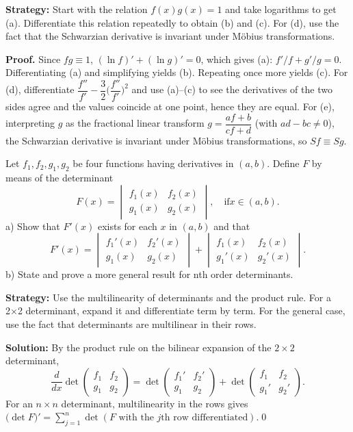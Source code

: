 \noindent\textbf{Strategy:} Start with the relation \( f(x)g(x) = 1 \) and take logarithms to get (a). Differentiate this relation repeatedly to obtain (b) and (c). For (d), use the fact that the Schwarzian derivative is invariant under Möbius transformations.

\noindent\textbf{Proof.}
Since $fg\equiv 1$, $(\ln f)'+(\ln g)'=0$, which gives (a): $f'/f+g'/g=0$. Differentiating (a) and simplifying yields (b). Repeating once more yields (c). For (d), differentiate $\dfrac{f''}{f'}-\dfrac{3}{2}\Big(\dfrac{f''}{f'}\Big)^{\!2}$ and use (a)–(c) to see the derivatives of the two sides agree and the values coincide at one point, hence they are equal. For (e), interpreting $g$ as the fractional linear transform $g=\dfrac{af+b}{cf+d}$ (with $ad-bc\ne 0$), the Schwarzian derivative is invariant under Möbius transformations, so $Sf\equiv Sg$.



\begin{problembox}
Let \( f_1, f_2, g_1, g_2 \) be four functions having derivatives in \( (a, b) \). Define \( F \) by means of the determinant
\[ F(x) = \begin{vmatrix}
f_1(x) & f_2(x) \\
g_1(x) & g_2(x)
\end{vmatrix}, \quad \text{if} x \in (a, b). \]
a) Show that \( F'(x) \) exists for each \( x \) in \( (a, b) \) and that
\[ F'(x) = \begin{vmatrix}
f_1'(x) & f_2'(x) \\
g_1(x) & g_2(x)
\end{vmatrix} + \begin{vmatrix}
f_1(x) & f_2(x) \\
g_1'(x) & g_2'(x)
\end{vmatrix}. \]
b) State and prove a more general result for nth order determinants.
\end{problembox}

\noindent\textbf{Strategy:} Use the multilinearity of determinants and the product rule. For a 2×2 determinant, expand it and differentiate term by term. For the general case, use the fact that determinants are multilinear in their rows.

\bigskip\noindent\textbf{Solution:}
By the product rule on the bilinear expansion of the $2\times2$ determinant,
\[\frac{d}{dx}\det\begin{pmatrix}f_1&f_2\\ g_1&g_2\end{pmatrix}=\det\begin{pmatrix}f_1'&f_2'\\ g_1&g_2\end{pmatrix}+\det\begin{pmatrix}f_1&f_2\\ g_1'&g_2'\end{pmatrix}.\]
For an $n\times n$ determinant, multilinearity in the rows gives $\big(\det F\big)'=\sum_{j=1}^{n}\det(F\text{ with the $j$th row differentiated}).$\qed


